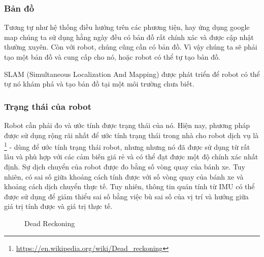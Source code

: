 \subsubsection*{Bản đồ}
Tương tự như hệ thống điều hướng trên các phương tiện, hay ứng dụng google map chúng ta sử dụng hằng ngày đều có bản đồ rất chính xác và được cập nhật thường xuyên. Còn với robot, chúng cũng cần có bản đồ. Vì vậy chúng ta sẽ phải tạo một bản đồ và cung cấp cho nó, hoặc robot có thể tự tạo bản đồ.

SLAM (Simultaneous Localization And Mapping) được phát triển để robot có thể tự nó khám phá và tạo bản đồ tại một môi trường chưa biết.

\subsubsection*{Trạng thái của robot}
Robot cần phải đo và ước tính được trạng thái của nó. Hiện nay, phương pháp được sử dụng rộng rãi nhất để ước tính trạng thái trong nhà cho robot dịch vụ là \footnote{\url{https://en.wikipedia.org/wiki/Dead_reckoning}} - dùng để ước tính trạng thái robot, nhưng nhưng nó đã được sử dụng từ rất lâu và phù hợp với các cảm biến giá rẻ và có thể đạt được một độ chính xác nhất định. Sự dịch chuyển của robot được đo bằng số vòng quay của bánh xe. Tuy nhiên, có sai số giữa khoảng cách tính được với số vòng quay của bánh xe và khoảng cách dịch chuyển thực tế. Tuy nhiên, thông tin quán tính từ IMU có thể được sử dụng để giảm thiểu sai số bằng việc bù sai số của vị trí và hướng giữa giá trị tính được và giá trị thực tế.

\begin{figure}
\centering
{}
  \caption{Dead Reckoning}
  \label{fig:deadReckoning}
\end{figure}

